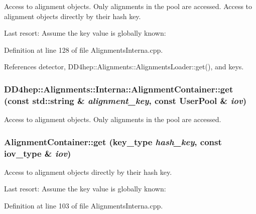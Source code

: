 Access to alignment objects. Only alignments in the pool are accessed. Access to alignment objects directly by their hash key. 

Last resort: Assume the key value is globally known: 

Definition at line 128 of file AlignmentsInterna.cpp.

References detector, DD4hep::Alignments::AlignmentsLoader::get(), and keys.\hypertarget{class_d_d4hep_1_1_alignments_1_1_interna_1_1_alignment_container_a3f1a415452fb4494cc7ddc2a84b2593a}{
\subsubsection[{get}]{ DD4hep::Alignments::Interna::AlignmentContainer::get (const std::string \& {\em alignment\_\-key}, \/  const UserPool \& {\em iov})}}
\label{class_d_d4hep_1_1_alignments_1_1_interna_1_1_alignment_container_a3f1a415452fb4494cc7ddc2a84b2593a}


Access to alignment objects. Only alignments in the pool are accessed. \hypertarget{class_d_d4hep_1_1_alignments_1_1_interna_1_1_alignment_container_af87ee43a853d77f00ba6ed6902f3b717}{
\subsubsection[{get}]{ AlignmentContainer::get ({\bf key\_\-type} {\em hash\_\-key}, \/  const {\bf iov\_\-type} \& {\em iov})}}
\label{class_d_d4hep_1_1_alignments_1_1_interna_1_1_alignment_container_af87ee43a853d77f00ba6ed6902f3b717}


Access to alignment objects directly by their hash key. 

Last resort: Assume the key value is globally known: 

Definition at line 103 of file AlignmentsInterna.cpp.

